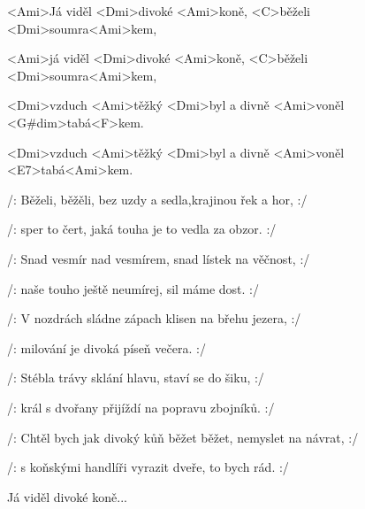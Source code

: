 

\zs
<Ami>Já viděl <Dmi>divoké <Ami>koně, <C>běželi 
<Dmi>soumra<Ami>kem, 

<Ami>já viděl <Dmi>divoké <Ami>koně, <C>běželi 
<Dmi>soumra<Ami>kem, 

<Dmi>vzduch <Ami>těžký <Dmi>byl a divně <Ami>voněl 
<G#dim>tabá<F>kem. 

<Dmi>vzduch <Ami>těžký <Dmi>byl a divně <Ami>voněl 
<E7>tabá<Ami>kem. \ks

\zs
/: Běželi, běžěli, bez uzdy a sedla,krajinou řek a hor, :/

/: sper to čert, jaká touha je to vedla za obzor. :/
\ks

\zs
/: Snad vesmír nad vesmírem, snad lístek na věčnost, :/

/: naše touho ještě neumírej, sil máme dost. :/
\ks

\zs
/: V nozdrách sládne zápach klisen na břehu jezera, :/

/: milování je divoká píseň večera. :/
\ks

\zs
/: Stébla trávy sklání hlavu, staví se do šiku, :/

/: král s dvořany přijíždí na popravu zbojníků. :/
\ks

\zs
/: Chtěl bych jak divoký kůň běžet běžet, nemyslet na návrat, :/

/: s koňskými handlíři vyrazit dveře, to bych rád. :/
\ks



Já viděl divoké koně... \kp

